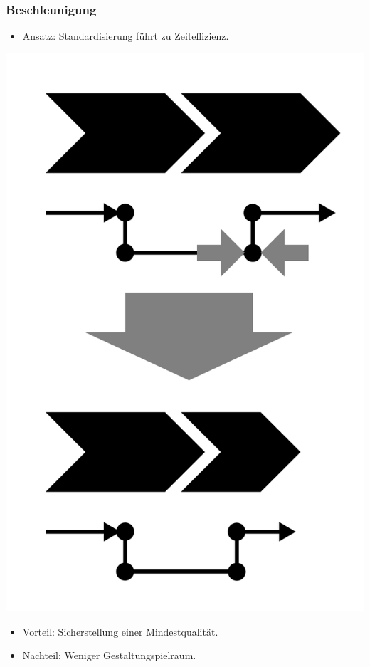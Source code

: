 \documentclass[xcolor=dvipsnames]{beamer}
\begin{document}
 \begin{frame}
  \frametitle{Beschleunigung}
  \begin{itemize}
    \item Ansatz: Standardisierung führt zu Zeiteffizienz.
  \end{itemize}
  \centerline{\includegraphics[scale=2.5]{4_6_2.png}}
  \begin{itemize}
    \item Vorteil: Sicherstellung einer Mindestqualität.
    \item Nachteil: Weniger Gestaltungspielraum.
  \end{itemize}
 \end{frame}
\end{document}
